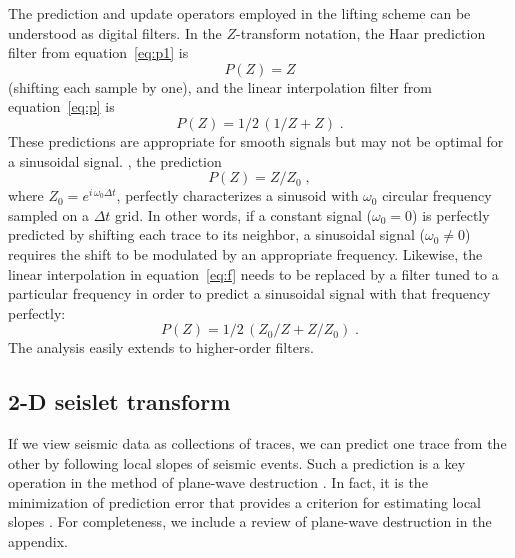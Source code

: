 The prediction and update operators employed in the lifting scheme can
be understood as digital filters. In the $Z$-transform notation, the
Haar prediction filter from equation~\ref{eq:p1} is
\begin{equation}
  \label{eq:f1}
  P(Z) = Z
\end{equation}
(shifting each sample by one), and the linear interpolation filter
from equation~\ref{eq:p} is
\begin{equation}
  \label{eq:f}
  P(Z) = 1/2\,(1/Z+Z)\;.
\end{equation}
These predictions are appropriate for smooth signals but may not be
optimal for a sinusoidal signal.  , the prediction
\begin{equation}
  \label{eq:s1}
  P(Z) = Z/Z_0\;,
\end{equation}
where $Z_0 = e^{i\,\omega_0 \Delta t}$, perfectly characterizes a
sinusoid with $\omega_0$ circular frequency sampled on a $\Delta t$
grid. In other words, if a constant signal ($\omega_0=0$) is perfectly
predicted by shifting each trace to its neighbor, a sinusoidal signal
($\omega_0\ne0$) requires the shift to be modulated by an appropriate
frequency. 
Likewise, the linear interpolation in equation~\ref{eq:f} needs to be
replaced by a filter tuned to a particular frequency in order to
predict a sinusoidal signal with that frequency perfectly:
\begin{equation}
  \label{eq:s}
  P(Z) = 1/2\,(Z_0/Z+Z/Z_0)\;.
\end{equation}
The analysis easily extends to higher-order filters.

\subsection{2-D seislet transform}

If we view seismic data as collections of traces, we can predict one
trace from the other by following local {slopes of} seismic
events. Such a prediction is a key operation in the method of
plane-wave destruction
\cite[]{GEO67-06-19461960}. In fact, it is the minimization of
prediction error that provides a criterion for estimating local slopes
\cite[]{pvi}. {For completeness, we include a review of plane-wave
destruction in the appendix.}

